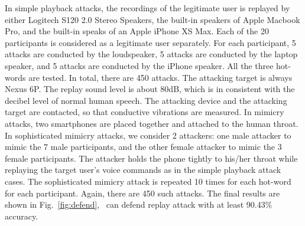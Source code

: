 In simple playback attacks, the recordings of the legitimate user is replayed by either Logitech S120 2.0 Stereo Speakers, the built-in speakers of Apple Macbook Pro, and the built-in speaks of an Apple iPhone XS Max. Each of the 20 participants is considered as a legitimate user separately. For each participant, 5 attacks are conducted by the loudspeaker, 5 attacks are conducted by the laptop speaker, and 5 attacks are conducted by the iPhone speaker. All the three hot-words are tested. In total, there are 450 attacks. The attacking target is always Nexus 6P. The replay sound level is about 80dB, which is in consistent with the decibel level of normal human speech. 
The attacking device and the attacking target  are contacted, so that conductive vibrations are measured. 
In mimicry attacks, two smartphones are placed together and attached to the human throat. In sophisticated mimicry attacks, we consider 2 attackers: one male attacker to mimic the 7 male participants, and the other female attacker to mimic the 3 female participants. The attacker holds the phone tightly to his/her throat while replaying the target user's voice commands as in the simple playback attack cases. The sophisticated mimicry attack is repeated 10 times for each hot-word for each participant. Again, there are 450 such attacks. The final results are shown in Fig.~\ref{fig:defend}, \shortname~can defend replay attack with at least 90.43\% accuracy.

